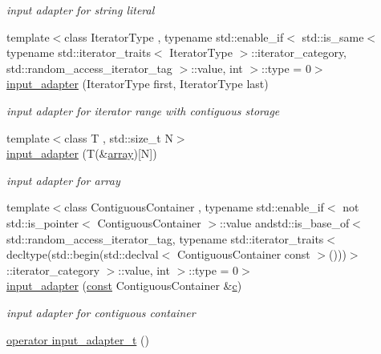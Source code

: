 \begin{DoxyCompactItemize}
\begin{DoxyCompactList}\small\item\em input adapter for string literal \end{DoxyCompactList}\item 
{\footnotesize template$<$class Iterator\+Type , typename std\+::enable\+\_\+if$<$ std\+::is\+\_\+same$<$ typename std\+::iterator\+\_\+traits$<$ Iterator\+Type $>$\+::iterator\+\_\+category, std\+::random\+\_\+access\+\_\+iterator\+\_\+tag $>$\+::value, int $>$\+::type  = 0$>$ }\\\hyperlink{classnlohmann_1_1detail_1_1input__adapter_ad6824b0f792691f75186c527fa31a6b4}{input\+\_\+adapter} (Iterator\+Type first, Iterator\+Type last)
\begin{DoxyCompactList}\small\item\em input adapter for iterator range with contiguous storage \end{DoxyCompactList}\item 
{\footnotesize template$<$class T , std\+::size\+\_\+t N$>$ }\\\hyperlink{classnlohmann_1_1detail_1_1input__adapter_aa2392138bf8307df1994dc7eb22d51ce}{input\+\_\+adapter} (T(\&\hyperlink{namespacenlohmann_1_1detail_a1ed8fc6239da25abcaf681d30ace4985af1f713c9e000f5d3f280adbd124df4f5}{array})\mbox{[}N\mbox{]})
\begin{DoxyCompactList}\small\item\em input adapter for array \end{DoxyCompactList}\item 
{\footnotesize template$<$class Contiguous\+Container , typename std\+::enable\+\_\+if$<$ not std\+::is\+\_\+pointer$<$ Contiguous\+Container $>$\+::value andstd\+::is\+\_\+base\+\_\+of$<$ std\+::random\+\_\+access\+\_\+iterator\+\_\+tag, typename std\+::iterator\+\_\+traits$<$ decltype(std\+::begin(std\+::declval$<$ Contiguous\+Container const  $>$()))$>$\+::iterator\+\_\+category $>$\+::value, int $>$\+::type  = 0$>$ }\\\hyperlink{classnlohmann_1_1detail_1_1input__adapter_a6f92fe82cb49a508dbfb297c5630cc7f}{input\+\_\+adapter} (\hyperlink{functions__c_8js_afacfd9c985d225bb07483b887a801b6f}{const} Contiguous\+Container \&\hyperlink{functions__f_8js_aadfd49790b56c82605242ff3896447ed}{c})
\begin{DoxyCompactList}\small\item\em input adapter for contiguous container \end{DoxyCompactList}\item 
\hyperlink{classnlohmann_1_1detail_1_1input__adapter_a4ef04b9490247fc38f3d1c2a9e18789b}{operator input\+\_\+adapter\+\_\+t} ()
\end{DoxyCompactItemize}


